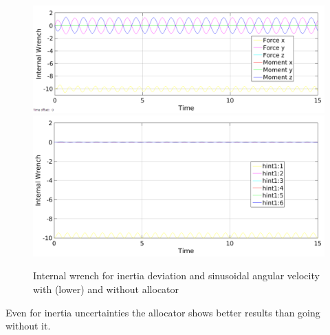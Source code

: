 \documentclass[conference]{IEEEtran}
\begin{document}
\begin{figure}
\includegraphics[width=\linewidth]{IntDevNullSinus}
\includegraphics[width=\linewidth]{IntDevAlloSinus}
\caption{Internal wrench for inertia deviation and sinusoidal angular velocity with (lower) and without allocator}
\label{IntDevPT1}
\end{figure}
Even for inertia uncertainties the allocator shows better results than going without it.
\end{document}
